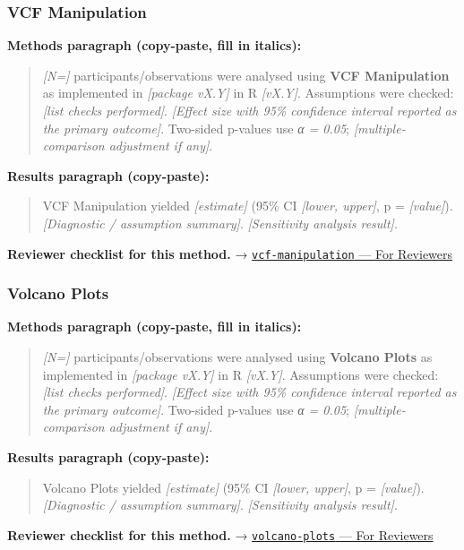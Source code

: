 \documentclass[
]{article}
\begin{document}
\subsubsection{VCF Manipulation}\label{vcf-manipulation}

\textbf{Methods paragraph (copy-paste, fill in italics):}

\begin{quote}
\emph{{[}N={]}} participants/observations were analysed using
\textbf{VCF Manipulation} as implemented in \emph{{[}package vX.Y{]}} in
R \emph{{[}vX.Y{]}}. Assumptions were checked: \emph{{[}list checks
performed{]}}. \emph{{[}Effect size with 95\% confidence interval
reported as the primary outcome{]}}. Two-sided p-values use \emph{α =
0.05}; \emph{{[}multiple-comparison adjustment if any{]}}.
\end{quote}

\textbf{Results paragraph (copy-paste):}

\begin{quote}
VCF Manipulation yielded \emph{{[}estimate{]}} (95\% CI \emph{{[}lower,
upper{]}}, p = \emph{{[}value{]}}). \emph{{[}Diagnostic / assumption
summary{]}}. \emph{{[}Sensitivity analysis result{]}}.
\end{quote}

\textbf{Reviewer checklist for this method.} →
\href{../chapters/12-bioinformatics/vcf-manipulation.Rmd\#for-reviewers}{\texttt{vcf-manipulation}
--- For Reviewers}

\subsubsection{Volcano Plots}\label{volcano-plots}

\textbf{Methods paragraph (copy-paste, fill in italics):}

\begin{quote}
\emph{{[}N={]}} participants/observations were analysed using
\textbf{Volcano Plots} as implemented in \emph{{[}package vX.Y{]}} in R
\emph{{[}vX.Y{]}}. Assumptions were checked: \emph{{[}list checks
performed{]}}. \emph{{[}Effect size with 95\% confidence interval
reported as the primary outcome{]}}. Two-sided p-values use \emph{α =
0.05}; \emph{{[}multiple-comparison adjustment if any{]}}.
\end{quote}

\textbf{Results paragraph (copy-paste):}

\begin{quote}
Volcano Plots yielded \emph{{[}estimate{]}} (95\% CI \emph{{[}lower,
upper{]}}, p = \emph{{[}value{]}}). \emph{{[}Diagnostic / assumption
summary{]}}. \emph{{[}Sensitivity analysis result{]}}.
\end{quote}

\textbf{Reviewer checklist for this method.} →
\href{../chapters/12-bioinformatics/volcano-plots.Rmd\#for-reviewers}{\texttt{volcano-plots}
--- For Reviewers}
\end{document}
